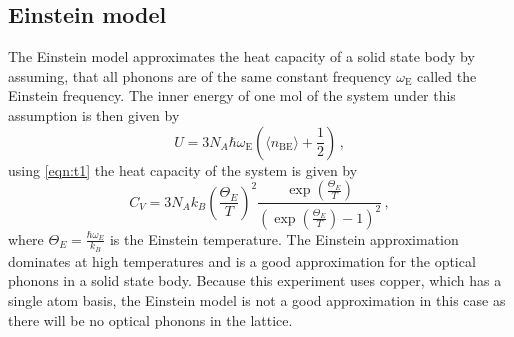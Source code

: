 \subsection{Einstein model}
\label{sec:t1}
The Einstein model approximates the heat capacity of a solid state body by assuming, that all phonons are of the same constant frequency $\omega_\text{E}$ called the Einstein frequency.
The inner energy of one mol of the system under this assumption is then given by 
\begin{equation}
    U = 3 N_A \hbar \omega_\text{E} \left( \langle n_\text{BE} \rangle + \frac{1}{2} \right) \, ,
\end{equation}
using \autoref{eqn:t1} the heat capacity of the system is given by
\begin{equation}
    C_V = 3 N_A k_B \left( \frac{\Theta_E}{T} \right)^2 \frac{\exp \left( \frac{\Theta_E}{T} \right)}{\left( \exp \left( \frac{\Theta_E}{T} \right) - 1 \right)^2} \, ,
\end{equation}
where $\Theta_E = \frac{\hbar \omega_E}{k_B}$ is the Einstein temperature.
The Einstein approximation dominates at high temperatures and is a good approximation for the optical phonons in a solid state body. Because this experiment uses copper, which has a single atom basis, the Einstein model is not a good approximation in this case as there will be no optical phonons in the lattice.
